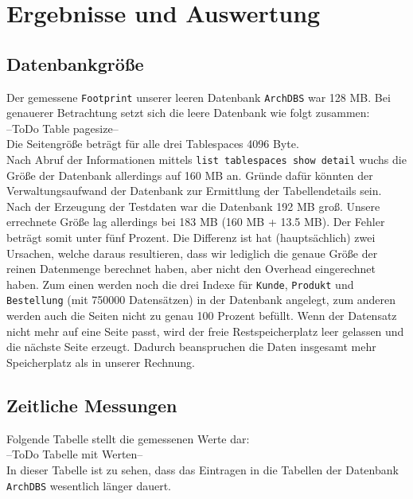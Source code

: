 \chapter{Ergebnisse und Auswertung}
\section{Datenbankgröße}
Der gemessene \texttt{Footprint} unserer leeren Datenbank \texttt{ArchDBS} war 128 MB. Bei genauerer Betrachtung setzt sich die leere Datenbank wie folgt zusammen:\\

--ToDo Table pagesize--\\

Die Seitengröße beträgt für alle drei Tablespaces 4096 Byte.\\

Nach Abruf der Informationen mittels \texttt{list tablespaces show detail} wuchs die Größe der Datenbank allerdings auf 160 MB an. Gründe dafür könnten der Verwaltungsaufwand der Datenbank zur Ermittlung der Tabellendetails sein.\\

Nach der Erzeugung der Testdaten war die Datenbank 192 MB groß. Unsere errechnete Größe lag allerdings bei 183 MB (160 MB + 13.5 MB). Der Fehler beträgt somit unter fünf Prozent. Die Differenz ist hat (hauptsächlich) zwei Ursachen, welche daraus resultieren, dass wir lediglich die genaue Größe der reinen Datenmenge berechnet haben, aber nicht den Overhead eingerechnet haben. Zum einen werden noch die drei Indexe für \texttt{Kunde}, \texttt{Produkt} und \texttt{Bestellung} (mit 750000 Datensätzen) in der Datenbank angelegt, zum anderen werden auch die Seiten nicht zu genau 100 Prozent befüllt. Wenn der Datensatz nicht mehr auf eine Seite passt, wird der freie Restspeicherplatz leer gelassen und die nächste Seite erzeugt. Dadurch beanspruchen die Daten insgesamt mehr Speicherplatz als in unserer Rechnung.\\

\section{Zeitliche Messungen}
Folgende Tabelle stellt die gemessenen Werte dar:\\
--ToDo Tabelle mit Werten--\\

In dieser Tabelle ist zu sehen, dass das Eintragen in die Tabellen der Datenbank \texttt{ArchDBS} wesentlich länger dauert.